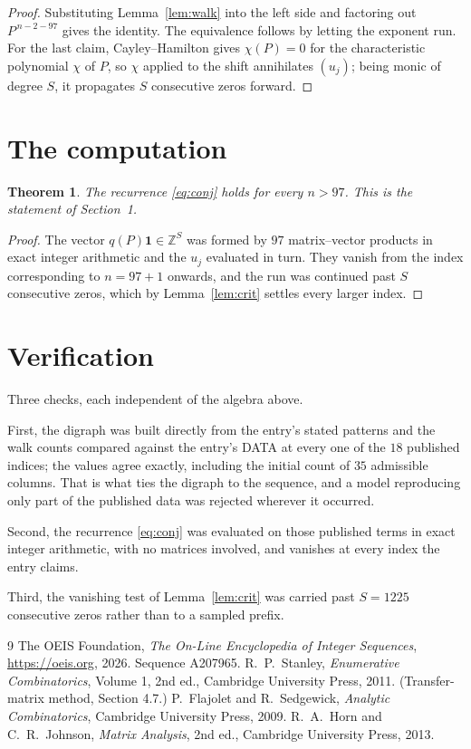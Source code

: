 \documentclass[11pt,a4paper]{article}
\theoremstyle{plain}
\newtheorem{theorem}{Theorem}
\theoremstyle{definition}
\begin{document}
\begin{proof}
Substituting Lemma~\ref{lem:walk} into the left side and factoring out
$P^{\,n-2-97}$ gives the identity. The equivalence follows by letting the exponent
run. For the last claim, Cayley--Hamilton gives $\chi(P)=0$ for the characteristic
polynomial $\chi$ of $P$, so $\chi$ applied to the shift annihilates $(u_j)$; being monic of
degree $S$, it propagates $S$ consecutive zeros forward.
\end{proof}

\section{The computation}

\begin{theorem}
The recurrence \eqref{eq:conj} holds for every $n>97$. This is the statement of
Section~1.
\end{theorem}

\begin{proof}
The vector $q(P)\mathbf{1}\in\mathbb{Z}^{S}$ was formed by $97$ matrix--vector
products in exact integer arithmetic and the $u_j$ evaluated in turn. They vanish from the
index corresponding to $n=97+1$ onwards, and the run was continued past $S$ consecutive
zeros, which by Lemma~\ref{lem:crit} settles every larger index.
\end{proof}

\section{Verification}

Three checks, each independent of the algebra above.

First, the digraph was built directly from the entry's stated patterns and the walk counts
compared against the entry's DATA at every one of the $18$ published indices; the
values agree exactly, including the initial count of $35$ admissible columns. That is
what ties the digraph to the sequence, and a model reproducing only part of the published
data was rejected wherever it occurred.

Second, the recurrence \eqref{eq:conj} was evaluated on those published terms in exact
integer arithmetic, with no matrices involved, and vanishes at every index the entry claims.

Third, the vanishing test of Lemma~\ref{lem:crit} was carried past $S=1225$ consecutive
zeros rather than to a sampled prefix.

\begin{thebibliography}{9}
 The OEIS Foundation, \emph{The On-Line Encyclopedia of Integer
Sequences}, \url{https://oeis.org}, 2026. Sequence A207965.
 R.~P.~Stanley, \emph{Enumerative Combinatorics}, Volume 1, 2nd ed.,
Cambridge University Press, 2011. (Transfer-matrix method, Section 4.7.)
 P.~Flajolet and R.~Sedgewick, \emph{Analytic Combinatorics}, Cambridge
University Press, 2009.
 R.~A.~Horn and C.~R.~Johnson, \emph{Matrix Analysis}, 2nd ed., Cambridge
University Press, 2013.
\end{thebibliography}
\end{document}
